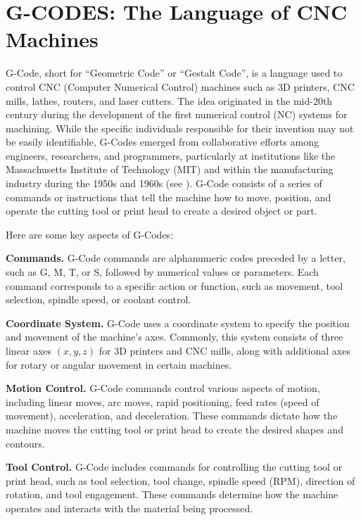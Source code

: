 \chapter{G-CODES: The Language of CNC Machines}


G-Code, short for {\textquotedblleft}Geometric Code{\textquotedblright} or {\textquotedblleft}Gestalt Code{\textquotedblright}, is a language used to control CNC (Computer Numerical Control) machines such as 3D printers, CNC mills, lathes, routers, and laser cutters.
The idea originated in the mid-20th century during the development of the first numerical control (NC) systems for machining.
While the specific individuals responsible for their invention may not be easily identifiable, G-Codes emerged from collaborative efforts among engineers, researchers, and programmers, particularly at institutions like the Massachusetts Institute of Technology (MIT) and within the manufacturing industry during the 1950s and 1960s  (see \cite{marlinfwweb}).
G-Code consists of a series of commands or instructions that tell the machine how to move, position, and operate the cutting tool or print head to create a desired object or part.

Here are some key aspects of G-Codes:

\noindent\textbf{Commands.}
G-Code commands are alphanumeric codes preceded by a letter, such as G, M, T, or S, followed by numerical values or parameters.
Each command corresponds to a specific action or function, such as movement, tool selection, spindle speed, or coolant control.

\noindent\textbf{Coordinate System.}
G-Code uses a coordinate system to specify the position and movement of the machine's axes.
Commonly, this system consists of three linear axes $(x,y,z)$ for 3D printers and CNC mills,
along with additional axes for rotary or angular movement in certain machines.

\noindent\textbf{Motion Control.}
G-Code commands control various aspects of motion, including linear moves, arc moves,
rapid positioning, feed rates (speed of movement), acceleration, and deceleration.
These commands dictate how the machine moves the cutting tool or print head to create the desired shapes and contours.

\noindent\textbf{Tool Control.}
G-Code includes commands for controlling the cutting tool or print head,
such as tool selection, tool change, spindle speed (RPM), direction of rotation, and tool engagement.
These commands determine how the machine operates and interacts with the material being processed.

